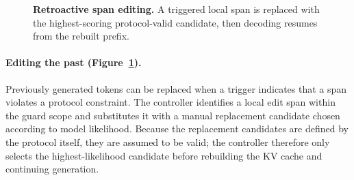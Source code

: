 \documentclass[twocolumn]{article}
\begin{document}
\begin{figure}[!htbp]
{%
  } \caption{\textbf{Retroactive span editing.} A triggered local span is
    replaced with the highest-scoring protocol-valid candidate, then decoding
    resumes from the rebuilt prefix.}\label{fig:ae_retroactive_edit}
\end{figure}

\paragraph{Editing the past (Figure~\ref{fig:ae_retroactive_edit}).} Previously
generated tokens can be replaced when a trigger indicates that a span violates a
protocol constraint. The controller identifies a local edit span within the
guard scope and substitutes it with a manual replacement candidate chosen
according to model likelihood. Because the replacement candidates are defined
by the protocol itself, they are assumed to be valid; the controller therefore
only selects the highest-likelihood candidate before rebuilding the KV cache and
continuing generation.
\end{document}
